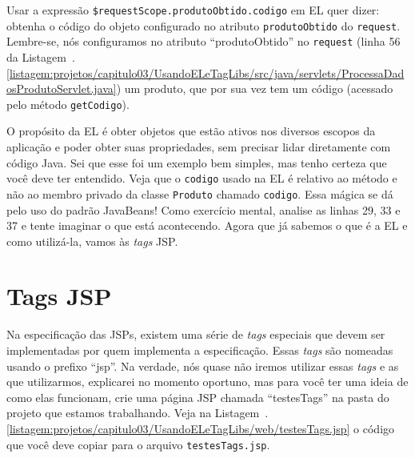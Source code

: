 Usar a expressão \texttt{\${requestScope.produtoObtido.codigo}} em EL quer dizer: obtenha o código do objeto configurado no atributo \texttt{produtoObtido} do \texttt{request}. Lembre-se, nós configuramos no atributo ``produtoObtido'' no \texttt{request} (linha 56 da Listagem~\thechapter.\ref{listagem:projetos/capitulo03/UsandoELeTagLibs/src/java/servlets/ProcessaDadosProdutoServlet.java}) um produto, que por sua vez tem um código (acessado pelo método \texttt{getCodigo}).

O propósito da EL é obter objetos que estão ativos nos diversos escopos da aplicação e poder obter suas propriedades, sem precisar lidar diretamente com código Java. Sei que esse foi um exemplo bem simples, mas tenho certeza que você deve ter entendido. Veja que o \texttt{codigo} usado na EL é relativo ao método  e não ao membro privado da classe \texttt{Produto} chamado \texttt{codigo}. Essa mágica se dá pelo uso do padrão JavaBeans! Como exercício mental, analise as linhas 29, 33 e 37 e tente imaginar o que está acontecendo. Agora que já sabemos o que é a EL e como utilizá-la, vamos às \textit{tags} JSP.


\section{Tags JSP}

Na especificação das JSPs, existem uma série de \textit{tags} especiais que devem ser implementadas por quem implementa a especificação. Essas \textit{tags} são nomeadas usando o prefixo ``jsp''. Na verdade, nós quase não iremos utilizar essas \textit{tags} e as que utilizarmos, explicarei no momento oportuno, mas para você ter uma ideia de como elas funcionam, crie uma página JSP chamada ``testesTags'' na pasta  do projeto que estamos trabalhando. Veja na Listagem~\thechapter.\ref{listagem:projetos/capitulo03/UsandoELeTagLibs/web/testesTags.jsp} o código que você deve copiar para o arquivo \texttt{testesTags.jsp}. 


